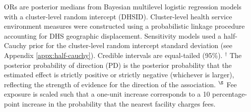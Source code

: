 \begin{table}[H]
\begin{threeparttable}
{\begin{tabular}{l ll ll}
\end{tabular}

\begin{tablenotes}[flushleft]
\fontsize{9pt}{10.5pt}\selectfont
\setlength{\itemsep}{0pt}
\setlength{\parsep}{0pt}
\setlength{\leftskip}{0pt}
\item ORs are posterior medians from Bayesian multilevel logistic regression models with a cluster-level random intercept (DHSID). Cluster-level health service environment measures were constructed using a probabilistic linkage procedure accounting for DHS geographic displacement. Sensitivity models used a half-Cauchy prior for the cluster-level random intercept standard deviation (see Appendix \ref{appx:half-cauchy}). Credible intervals are equal-tailed (95\%). 
$^{\dagger}$ The posterior probability of direction (PD) is the posterior probability that the estimated effect is strictly positive or strictly negative (whichever is larger), reflecting the strength of evidence for the direction of the association. 
$^{\S}$ Fee exposure is scaled such that a one-unit increase corresponds to a 10 percentage-point increase in the probability that the nearest facility charges fees.
\end{tablenotes}

}
\end{threeparttable}
\end{table}





\restoregeometry